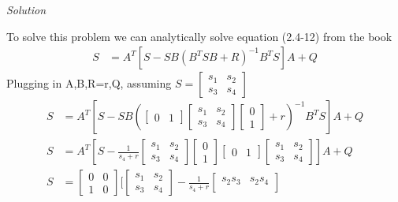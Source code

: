 \documentclass{article}
\begin{document}
  \noindent \textit{Solution} \newline \newline
  
  To solve this problem we can analytically solve equation (2.4-12) from the book
  \begin{align*}
	  S&=A^T[S-SB(B^TSB+R)^{-1}B^TS]A+Q
  \end{align*}
  Plugging in A,B,R=r,Q, assuming $S=
  \begin{bmatrix}
	  s_1 & s_2 \\
	  s_3 & s_4
  \end{bmatrix}$
  \begin{align*}
	  S&=A^T[S-SB(
	  \begin{bmatrix}
		  0 & 1
	  \end{bmatrix}
          \begin{bmatrix}
	          s_1 & s_2 \\
	          s_3 & s_4
          \end{bmatrix}
	  \begin{bmatrix}
		  0 \\
		  1
	  \end{bmatrix}+r)^{-1}B^TS]A+Q \\
	  S&=A^T[S-
	  \frac{1}{s_4+r}
	  \begin{bmatrix}
	          s_1 & s_2 \\
	          s_3 & s_4
          \end{bmatrix}
	  \begin{bmatrix}
		  0 \\
		  1
	  \end{bmatrix}
	  \begin{bmatrix}
		  0 & 1
	  \end{bmatrix}
	  \begin{bmatrix}
	          s_1 & s_2 \\
	          s_3 & s_4
          \end{bmatrix}
	  ]A+Q \\
	  S&=
	  \begin{bmatrix}
		  0 & 0 \\
		  1 & 0
	  \end{bmatrix}
	  [\begin{bmatrix}
	          s_1 & s_2 \\
	          s_3 & s_4
          \end{bmatrix}-
	  \frac{1}{s_4+r}
	  \begin{bmatrix}
	          s_2s_3 & s_2s_4 \\

\end{bmatrix}
\end{align*}
\end{document}
